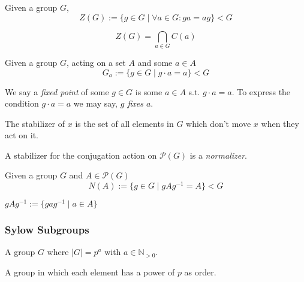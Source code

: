 \begin{definition}[Center]
   Given a group \(G\),
   \[Z(G) := \{g \in G \mid \forall a \in G: ga = ag\} < G\]
\end{definition}
\begin{remark}
   \[Z(G) = \bigcap_{a \in G} C(a)\]
\end{remark}

\begin{definition}[Stabilizer]
   Given a group \(G\), acting on a set \(A\) and some \(a \in A\)
   \[G_a := \{g \in G \mid g \cdot a = a\} < G\]
\end{definition}
\begin{remark}[Terminology]
   We say a \emph{fixed point} of some \(g \in G\) is some \(a \in A\) s.t. \(g \cdot a = a\).
   To express the condition \(g \cdot a = a\) we may say, \emph{\(g\) fixes \(a\)}.
\end{remark}
\begin{remark}[Intuition]
   The stabilizer of \(x\) is the set of all elements in \(G\) which don't move \(x\) when they act on it.
\end{remark}

A stabilizer for the conjugation action on \(\mathcal{P}(G)\) is a \emph{normalizer}.

\begin{definition}[Normalizer]
   Given a group \(G\) and \(A \in \mathcal{P}(G)\)
   \[N(A) := \{g \in G \mid gAg^{-1} = A\} < G\]
\end{definition}
\begin{remark}
   \(gAg^{-1} := \{gag^{-1} \mid a \in A\}\)
\end{remark}

\subsubsection{Sylow Subgroups}
\begin{definition}[\(p\)-Group]
   A group \(G\) where \(|G| = p^a\) with \(a \in \mathbb{N}_{>0}\).
\end{definition}
\begin{remark}
   A group in which each element has a power of \(p\) as order.
\end{remark}

